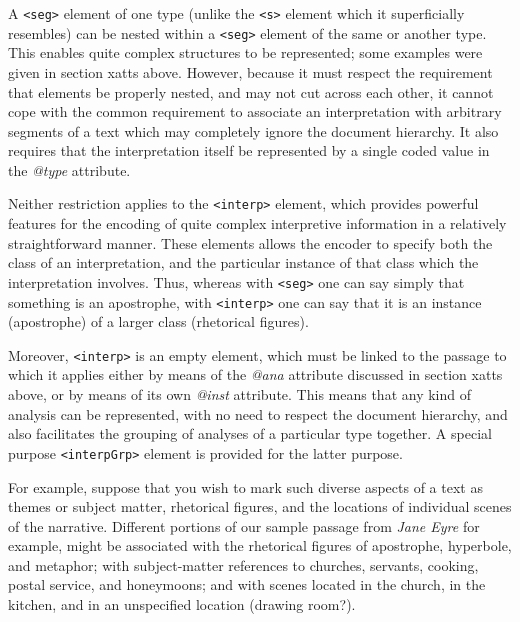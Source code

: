 \documentclass[11pt,twoside]{article}\makeatletter
\begin{document}
A \texttt{<seg>} element of one type (unlike the \texttt{<s>} element which it superficially resembles) can be nested within a \texttt{<seg>} element of the same or another type. This enables quite complex structures to be represented; some examples were given in section xatts above. However, because it must respect the requirement that elements be properly nested, and may not cut across each other, it cannot cope with the common requirement to associate an interpretation with arbitrary segments of a text which may completely ignore the document hierarchy. It also requires that the interpretation itself be represented by a single coded value in the \textit{@type} attribute.\par
Neither restriction applies to the \texttt{<interp>} element, which provides powerful features for the encoding of quite complex interpretive information in a relatively straightforward manner.  These elements allows the encoder to specify both the class of an interpretation, and the particular instance of that class which the interpretation involves. Thus, whereas with \texttt{<seg>} one can say simply that something is an apostrophe, with \texttt{<interp>} one can say that it is an instance (apostrophe) of a larger class (rhetorical figures).\par
Moreover, \texttt{<interp>} is an empty element, which must be linked to the passage to which it applies either by means of the \textit{@ana} attribute discussed in section xatts above, or by means of its own \textit{@inst} attribute. This means that any kind of analysis can be represented, with no need to respect the document hierarchy, and also facilitates the grouping of analyses of a particular type together. A special purpose \texttt{<interpGrp>} element is provided for the latter purpose.\par
For example, suppose that you wish to mark such diverse aspects of a text as themes or subject matter, rhetorical figures, and the locations of individual scenes of the narrative. Different portions of our sample passage from \textit{Jane Eyre} for example, might be associated with the rhetorical figures of apostrophe, hyperbole, and metaphor; with subject-matter references to churches, servants, cooking, postal service, and honeymoons; and with scenes located in the church, in the kitchen, and in an unspecified location (drawing room?).\par
\end{document}
